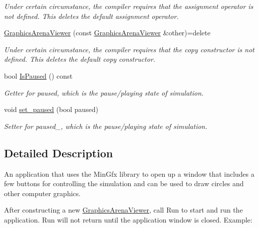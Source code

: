 \begin{DoxyCompactItemize}
\begin{DoxyCompactList}\small\item\em Under certain circumstance, the compiler requires that the assignment operator is not defined. This {\ttfamily deletes} the default assignment operator. \end{DoxyCompactList}\item 
\hyperlink{classGraphicsArenaViewer_afa70b72e0769db0f3f41fe37bc540621}{Graphics\+Arena\+Viewer} (const \hyperlink{classGraphicsArenaViewer}{Graphics\+Arena\+Viewer} \&other)=delete\hypertarget{classGraphicsArenaViewer_afa70b72e0769db0f3f41fe37bc540621}{}\label{classGraphicsArenaViewer_afa70b72e0769db0f3f41fe37bc540621}

\begin{DoxyCompactList}\small\item\em Under certain circumstance, the compiler requires that the copy constructor is not defined. This {\ttfamily deletes} the default copy constructor. \end{DoxyCompactList}\item 
bool \hyperlink{classGraphicsArenaViewer_abec101b321264e48735dd4b5e07a4948}{Is\+Paused} () const 
\begin{DoxyCompactList}\small\item\em Getter for paused, which is the pause/playing state of simulation. \end{DoxyCompactList}\item 
void \hyperlink{classGraphicsArenaViewer_ac29ca2bcf0d6c9f5ca759248ee50dcc8}{set\+\_\+paused} (bool paused)\hypertarget{classGraphicsArenaViewer_ac29ca2bcf0d6c9f5ca759248ee50dcc8}{}\label{classGraphicsArenaViewer_ac29ca2bcf0d6c9f5ca759248ee50dcc8}

\begin{DoxyCompactList}\small\item\em Setter for paused\+\_\+, which is the pause/playing state of simulation. \end{DoxyCompactList}\end{DoxyCompactItemize}


\subsection{Detailed Description}
An application that uses the Min\+Gfx library to open up a window that includes a few buttons for controlling the simulation and can be used to draw circles and other computer graphics. 

After constructing a new \hyperlink{classGraphicsArenaViewer}{Graphics\+Arena\+Viewer}, call Run to start and run the application. Run will not return until the application window is closed. Example\+:


